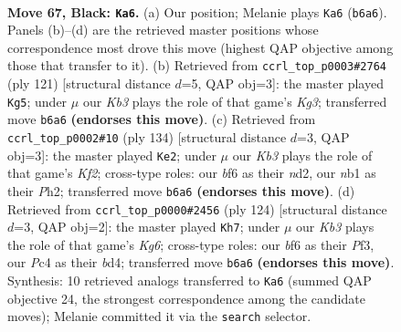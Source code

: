 \documentclass[11pt]{article}
\begin{document}
\clearpage

\begin{figure}[p]\centering
\begin{subfigure}{0.46\textwidth}\centering
\resizebox{\linewidth}{!}{%
\newchessgame
\chessboard[
  setfen={8/8/1k3B2/p7/2p3b1/8/5K2/1N6 b - - 3 67},
  showmover=false,
  pgfstyle=straightmove, color=movearrow, markmove={b6-a6}
]}
\caption{}
\end{subfigure}\hfill
\begin{subfigure}{0.46\textwidth}\centering
\resizebox{\linewidth}{!}{%
\newchessgame
\chessboard[
  setfen={8/b7/4B1kp/8/4P3/8/4K3/8 b - - 8 61},
  showmover=false,
  pgfstyle=straightmove, color=movearrow, markmove={g6-g5}
]}
\caption{}
\end{subfigure}
\\[4pt]
\begin{subfigure}{0.46\textwidth}\centering
\resizebox{\linewidth}{!}{%
\newchessgame
\chessboard[
  setfen={3B4/8/8/5p1k/8/4P3/3n1K1P/8 w - - 6 68},
  showmover=false,
  pgfstyle=straightmove, color=movearrow, markmove={f2-e2}
]}
\caption{}
\end{subfigure}\hfill
\begin{subfigure}{0.46\textwidth}\centering
\resizebox{\linewidth}{!}{%
\newchessgame
\chessboard[
  setfen={8/4k3/6KP/8/3b4/5P2/B7/8 w - - 3 63},
  showmover=false,
  pgfstyle=straightmove, color=movearrow, markmove={g6-h7}
]}
\caption{}
\end{subfigure}
\caption{\textbf{Move 67, Black: \texttt{Ka6}.} (a) Our position; Melanie plays \texttt{Ka6} (\texttt{b6a6}). Panels (b)--(d) are the retrieved master positions whose correspondence most drove this move (highest QAP objective among those that transfer to it). (b) Retrieved from \texttt{ccrl\_top\_p0003\#2764} (ply 121) [structural distance $d$=5, QAP obj=3]: the master played \texttt{Kg5}; under $\mu$ our \emph{Kb3} plays the role of that game's \emph{Kg3}; transferred move \texttt{b6a6} \textbf{(endorses this move)}. (c) Retrieved from \texttt{ccrl\_top\_p0002\#10} (ply 134) [structural distance $d$=3, QAP obj=3]: the master played \texttt{Ke2}; under $\mu$ our \emph{Kb3} plays the role of that game's \emph{Kf2}; cross-type roles: our \emph{b}f6 as their \emph{n}d2, our \emph{n}b1 as their \emph{P}h2; transferred move \texttt{b6a6} \textbf{(endorses this move)}. (d) Retrieved from \texttt{ccrl\_top\_p0000\#2456} (ply 124) [structural distance $d$=3, QAP obj=2]: the master played \texttt{Kh7}; under $\mu$ our \emph{Kb3} plays the role of that game's \emph{Kg6}; cross-type roles: our \emph{b}f6 as their \emph{P}f3, our \emph{P}c4 as their \emph{b}d4; transferred move \texttt{b6a6} \textbf{(endorses this move)}. Synthesis: 10 retrieved analogs transferred to \texttt{Ka6} (summed QAP objective 24, the strongest correspondence among the candidate moves); Melanie committed it via the \texttt{search} selector.}
\label{fig:thought-m133}
\end{figure}
\end{document}
